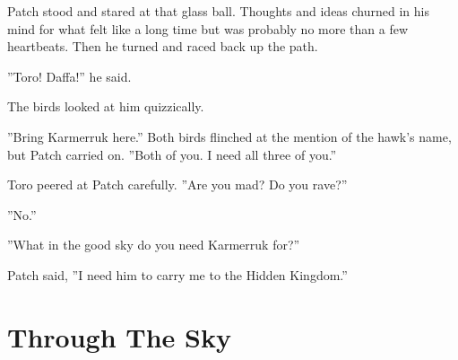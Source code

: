 \documentclass[12pt]{book}
\begin{document}
Patch stood and stared at that glass ball. Thoughts and ideas churned in his mind for what felt like a long time but was probably no more than a few heartbeats. Then he turned and raced back up the path.\par
''Toro! Daffa!'' he said.\par
The birds looked at him quizzically.\par
''Bring Karmerruk here.'' Both birds flinched at the mention of the hawk's name, but Patch carried on. ''Both of you. I need all three of you.''\par
Toro peered at Patch carefully. ''Are you mad? Do you rave?''\par
''No.''\par
''What in the good sky do you need Karmerruk for?''\par
Patch said, ''I need him to carry me to the Hidden Kingdom.''\par

\section{Through The Sky}
\end{document}
